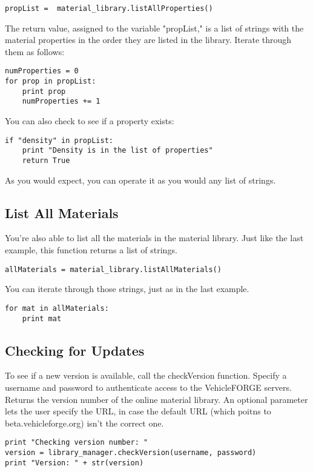 \documentclass[letter]{article}
\begin{document}
\begin{lstlisting}
propList =  material_library.listAllProperties()
\end{lstlisting}

The return value, assigned to the variable "propList," is a list of strings with the material properties in the order they are listed in the library. Iterate through them as follows:

\begin{lstlisting}
numProperties = 0
for prop in propList:
    print prop
    numProperties += 1
\end{lstlisting}

You can also check to see if a property exists:

\begin{lstlisting}
if "density" in propList:
	print "Density is in the list of properties"
	return True
\end{lstlisting}

As you would expect, you can operate it as you would any list of strings.

\subsection{List All Materials}
You're also able to list all the materials in the material library. Just like the last example, this function returns a list of strings. 

\begin{lstlisting}
allMaterials = material_library.listAllMaterials()
\end{lstlisting}

You can iterate through those strings, just as in the last example.

\begin{lstlisting}
for mat in allMaterials:
    print mat
\end{lstlisting}

\subsection{Checking for Updates}
To see if a new version is available, call the checkVersion function. Specify a username and password to authenticate access to the VehicleFORGE servers. Returns the version number of the online material library. An optional parameter lets the user specify the URL, in case the default URL (which poitns to beta.vehicleforge.org) isn't the correct one.
\begin{lstlisting}
print "Checking version number: "
version = library_manager.checkVersion(username, password)
print "Version: " + str(version)
\end{lstlisting}
\end{document}
